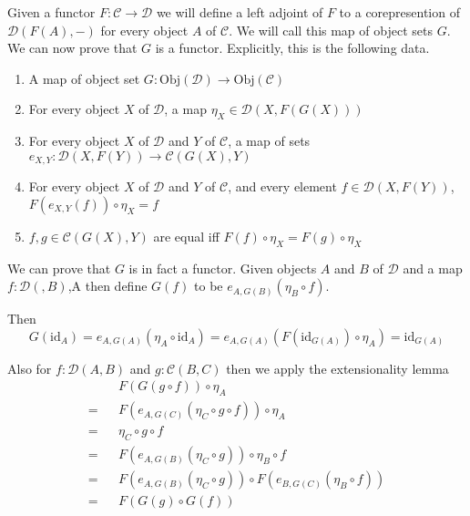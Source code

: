 \documentclass[12pt]{article} %
\theoremstyle{definition}
\theoremstyle{definition}
\theoremstyle{definition}
\theoremstyle{definition}
\begin{document}
Given a functor $F : \mathcal{C} \to \mathcal{D}$ we will define a left adjoint of $F$ to 
a corepresention of $\mathcal{D}(F(A),-)$ for every object $A$ of $\mathcal{C}$. We will call
this map of object sets $G$. We can now prove that $G$ is a functor. Explicitly,
this is the following data.

\begin{enumerate}
  \item A map of object set $G : \text{Obj}(\mathcal{D})\to \text{Obj}(\mathcal{C})$
  \item For every object $X$ of $\mathcal{D}$, a map $\eta_X \in \mathcal{D}(X, F(G(X)))$
  \item For every object $X$ of $\mathcal{D}$ and $Y$ of $\mathcal{C}$, 
    a map of sets $e_{X,Y} : \mathcal{D}(X, F(Y)) \to \mathcal{C}(G(X), Y)$
  \item For every object $X$ of $\mathcal{D}$ and $Y$ of $\mathcal{C}$, 
    and every element $f \in \mathcal{D}(X, F(Y))$, $F(e_{X,Y}(f)) \circ \eta_X = f$
  \item $f,g \in \mathcal{C}(G(X), Y)$ are equal iff $F(f) \circ \eta_X = F(g) \circ \eta_X$
\end{enumerate}

We can prove that $G$ is in fact a functor. 
Given objects $A$ and $B$ of $\mathcal{D}$ and a map $f : \mathcal{D}(, B)$,A
then define $G(f)$ to be $e_{A,G(B)}(\eta_B \circ f)$.

Then 
\begin{equation}
  G(\text{id}_A) = e_{A,G(A)}(\eta_A \circ \text{id}_A) = 
e_{A,G(A)}(F (\text{id}_{G(A)}) \circ \eta_A) = \text{id}_{G(A)}
\end{equation}

Also for $f : \mathcal{D}(A, B)$ and $g : \mathcal{C}(B, C)$
then we apply the extensionality lemma
\begin{equation}
  \begin{aligned}
     && F(G(g \circ f)) \circ \eta_A \\
   = && F(e_{A, G(C)}(\eta_C \circ g \circ f)) \circ \eta_A \\
   = && \eta_C \circ g \circ f \\
   = && F(e_{A, G(B)}(\eta_C \circ g)) \circ \eta_B \circ f \\
   = && F(e_{A, G(B)}(\eta_C \circ g)) \circ F(e_{B, G(C)}(\eta_B \circ f)) \\
   = && F(G(g) \circ G(f))
  \end{aligned}
\end{equation}
\end{document}
